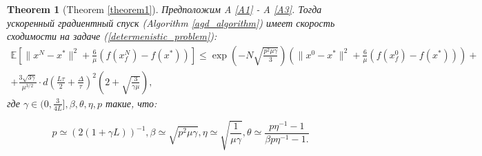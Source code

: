 \documentclass{article}
\newtheorem{theorem}{Theorem}
\begin{document}
\begin{theorem}[Theorem \ref{theorem1}]\label{theorem1_appendix}
   Предположим A \ref{A1} - A \ref{A3}. Тогда ускоренный градиентный спуск (Algorithm \ref{agd_algorithm}) имеет скорость сходимости на задаче (\ref{determenistic_problem}):
  \begin{equation}
   \begin{aligned}
   \mathbb{E}\left[\|x^N - x^*\|^2 + \frac{6}{\mu} (f(x_f^N) - f(x^*))\right] \leqslant \exp\left(- N\sqrt{\frac{p^2\mu\gamma}{3}}\right) \left(\|x^0 - x^*\|^2 + \frac{6}{\mu} (f(x_f^0) - f(x^*))\right) +\\ +\frac{3 \sqrt{3\gamma}}{\mu^{3/2}} \cdot d \left(\frac{L\tau}{2} + \frac{\Delta}{\tau}\right)^2\left(2 + \sqrt{\frac{3}{\gamma\mu}}\right),
   \label{deterministic_convergence}
   \end{aligned}
  \end{equation}
  где $\gamma \in (0, \frac{3}{4L}], \beta, \theta, \eta, p$ такие, что:

  \begin{equation}
   p \simeq (2(1 + \gamma L))^{-1}, \beta \simeq \sqrt{p^2 \mu \gamma}, \eta \simeq \sqrt{\frac{1}{\mu\gamma}}, \theta \simeq \frac{p \eta^{-1} - 1}{\beta p \eta^{-1} - 1.}
  \end{equation}
\end{theorem}
\end{document}
